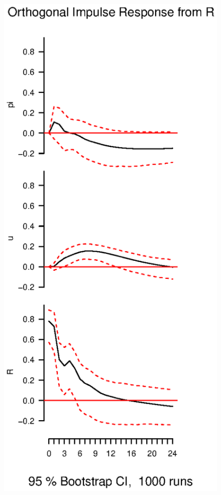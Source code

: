 \documentclass{beamer}
\begin{document}
\begin{frame}
  \begin{figure}
    \includegraphics[scale=.5]{interest_shock.eps}
  \end{figure}
\end{frame}
\end{document}
